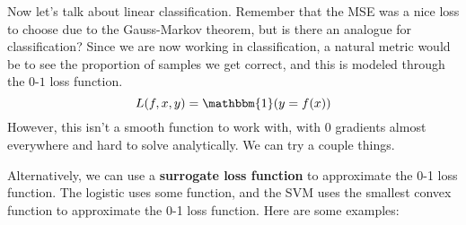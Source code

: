 Now let's talk about linear classification. Remember that the MSE was a nice loss to choose due to the Gauss-Markov theorem, but is there an analogue for classification? Since we are now working in classification, a natural metric would be to see the proportion of samples we get correct, and this is modeled through the $0$-$1$ loss function. 
\begin{equation}
  L(f, x, y) = \mathbbm{1}(y = f(x))
\end{equation} 
However, this isn't a smooth function to work with, with $0$ gradients almost everywhere and hard to solve analytically. We can try a couple things. 

Alternatively, we can use a \textbf{surrogate loss function} to approximate the 0-1 loss function. The logistic uses some function, and the SVM uses the smallest convex function to approximate the 0-1 loss function. Here are some examples: 

